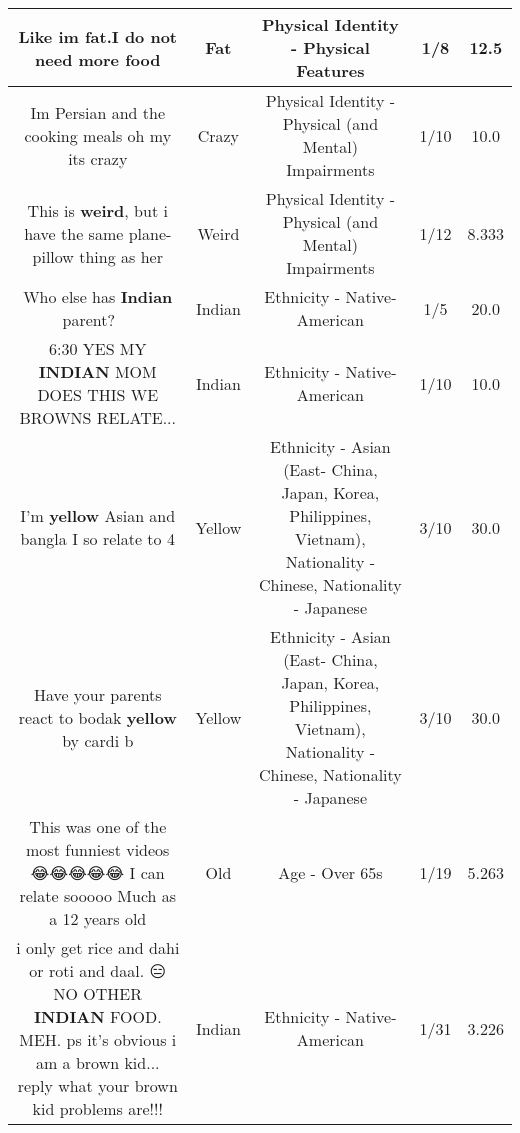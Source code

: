 \documentclass[11pt]{article}
\newlength\mylength
\begin{document}
\begin{center}
\begin{longtable}{|C{.65\mylength}|C{.30\mylength}|C{.12\mylength}|C{.12\mylength}|C{.12\mylength}|}
  \small Like im \textbf{fat}.I do not need more food\normalsize   & Fat & Physical Identity - Physical Features & 1/8 & 12.5 \\  \hline
  \small Im Persian and the cooking meals oh my its crazy\normalsize   & Crazy & Physical Identity - Physical (and Mental) Impairments & 1/10 & 10.0 \\  \hline
  \small This is \textbf{weird}, but i have the same plane-pillow thing as her\normalsize   & Weird & Physical Identity - Physical (and Mental) Impairments & 1/12 & 8.333 \\  \hline
  \small Who else has \textbf{Indian} parent?🙋🏽🙋🏽\normalsize   & Indian & Ethnicity - Native-American & 1/5 & 20.0 \\  \hline
  \small 6:30 YES MY \textbf{INDIAN} MOM DOES THIS WE BROWNS RELATE...\normalsize   & Indian & Ethnicity - Native-American & 1/10 & 10.0 \\  \hline
  \small I'm \textbf{y\textbf{e\textbf{llow}}} Asian and bangla I so relate to 4\normalsize   & Yellow & Ethnicity - Asian (East- China, Japan, Korea, Philippines, Vietnam), Nationality - Chinese, Nationality - Japanese & 3/10 & 30.0 \\  \hline
  \small Have your parents react to bodak \textbf{y\textbf{e\textbf{llow}}} by cardi b\normalsize   & Yellow & Ethnicity - Asian (East- China, Japan, Korea, Philippines, Vietnam), Nationality - Chinese, Nationality - Japanese & 3/10 & 30.0 \\  \hline
  \small This was one of the most funniest videos 😂😂😂😂😂 I can relate sooooo Much as a 12 years old\normalsize   & Old & Age - Over 65s & 1/19 & 5.263 \\  \hline
  \small i only get rice and dahi or roti and daal. 😑 NO OTHER \textbf{INDIAN} FOOD. MEH. ps it's obvious i am a brown kid... reply what your brown kid problems are!!!\normalsize   & Indian & Ethnicity - Native-American & 1/31 & 3.226 \\  \hline

\end{longtable}
\end{center}
\end{document}
